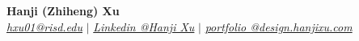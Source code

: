 \documentclass[letterpaper,10pt]{article}
\newcommand{\summaryBlock}[2]{
    \begin{taggedblock}{#1}
        \begin{itemize}[leftmargin=0.15in, label={}]
            \item{#2}
        \end{itemize}
    \end{taggedblock}
}
\begin{document}
\begin{flushleft}
    \textbf{\large Hanji (Zhiheng) Xu} \\    
    \href{mailto:hxu01@risd.edu}{{\textit{hxu01@risd.edu}}} $|$ 
    \href{https://linkedin.com/in/zhiheng-hanji-xu/}{{\textit{Linkedin @Hanji Xu}}} $|$
    \href{https://design.hanjixu.com/}{{\textit{portfolio @design.hanjixu.com}}}
    \vspace{-5pt}
\end{flushleft}

\end{document}
